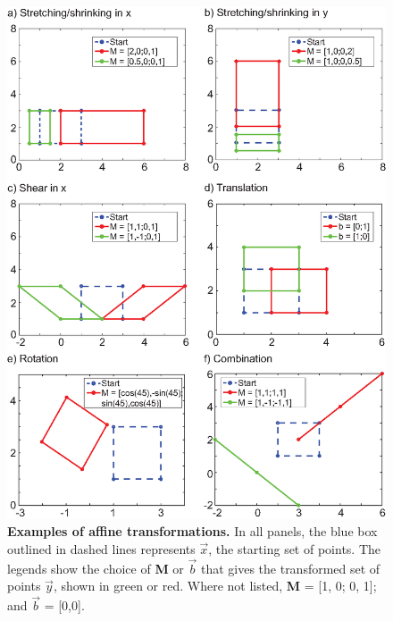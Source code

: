\documentclass[11pt]{article}
\begin{document}
\begin{figure}
\begin{center}
\includegraphics[width=5in]{TransformationFigures/AffineExamples.eps}
\caption[Examples of affine transformations.]{{\bf Examples of affine transformations.} In all panels, the blue box outlined in dashed lines represents $\vec{x}$, the starting set of points. The legends show the choice of {\bf M} or $\vec{b}$ that gives the transformed set of points $\vec{y}$, shown in green or red.  Where not listed, {\bf M} = [1, 0; 0, 1]; and $\vec{b}$ = [0,0]. }\label{fig:AffineExamples}
\end{center}
\end{figure}
\end{document}
